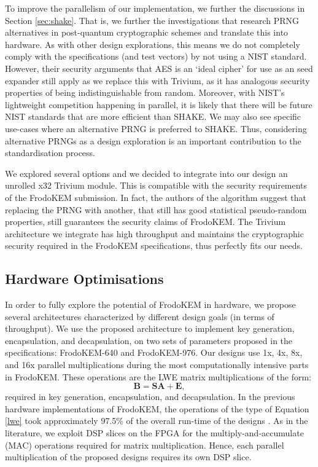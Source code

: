 To improve the parallelism of our implementation, we further the discussions in Section \ref{sec:shake}. That is, we further the investigations that research PRNG alternatives in post-quantum cryptographic schemes and translate this into hardware. As with other design explorations, this means we do not completely comply with the specifications (and test vectors) by not using a NIST standard. However, their security arguments that AES is an `ideal cipher' for use as an seed expander still apply as we replace this with Trivium, as it has analogous security properties of being indistinguishable from random. Moreover, with NIST's lightweight competition happening in parallel, it is likely that there will be future NIST standards that are more efficient than SHAKE. We may also see specific use-cases where an alternative PRNG is preferred to SHAKE. Thus, considering alternative PRNGs as a design exploration is an important contribution to the standardisation process.

We explored several options and we decided to integrate into our design an unrolled x32 Trivium \cite{de2008trivium} module. This is compatible with the security requirements of the FrodoKEM submission. In fact, the authors of the algorithm suggest that replacing the PRNG with another, that still has good statistical pseudo-random properties, still guarantees the security claims of FrodoKEM. The Trivium architecture we integrate has high throughput and maintains the cryptographic security required in the FrodoKEM specifications, thus perfectly fits our needs. %

\subsection{Hardware Optimisations}

In order to fully explore the potential of FrodoKEM in hardware, we propose several architectures characterized by different design goals (in terms of throughput). We use the proposed architecture to implement key generation, encapsulation, and decapsulation, on two sets of parameters proposed in the specifications: FrodoKEM-640 and FrodoKEM-976. Our designs use 1x, 4x, 8x, and 16x parallel multiplications during the most computationally intensive parts in FrodoKEM. These operations are the LWE matrix multiplications of the form:
\begin{equation}
\mathbf{B} = \mathbf{S} \mathbf{A} + \mathbf{E}, \label{lwe}
\end{equation}
 required in key generation, encapsulation, and decapsulation. In the previous hardware implementations of FrodoKEM, the operations of the type of Equation \ref{lwe} took approximately 97.5\% of the overall run-time of the designs \cite{howe2018standard}. As in the literature, we exploit DSP slices on the FPGA for the multiply-and-accumulate (MAC) operations required for matrix multiplication. Hence, each parallel multiplication of the proposed designs requires its own DSP slice.
 
